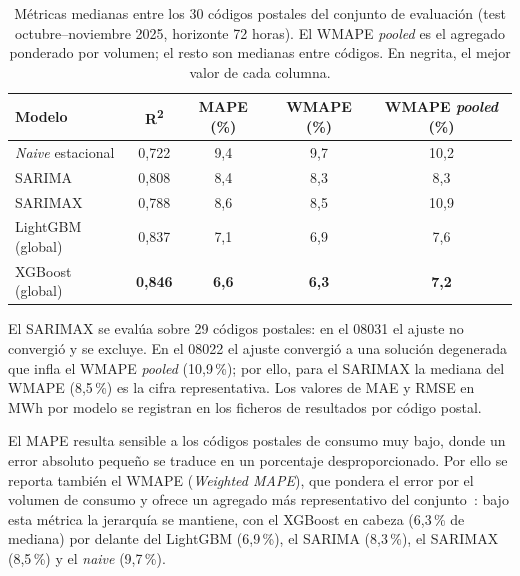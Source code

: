 \documentclass[12pt, a4paper]{article}
\begin{document}
\begin{table}[htbp]
\centering
\caption{Métricas medianas entre los 30 códigos postales del conjunto de evaluación (test octubre--noviembre 2025, horizonte 72 horas). El WMAPE \textit{pooled} es el agregado ponderado por volumen; el resto son medianas entre códigos. En negrita, el mejor valor de cada columna.}
\label{tab:comparativa}
\begin{tabular}{lcccc}
\toprule
Modelo & R\textsuperscript{2} & MAPE (\%) & WMAPE (\%) & WMAPE \textit{pooled} (\%) \\
\midrule
\textit{Naive} estacional & 0,722 & 9,4 & 9,7 & 10,2 \\
SARIMA & 0,808 & 8,4 & 8,3 & 8,3 \\
SARIMAX & 0,788 & 8,6 & 8,5 & 10,9 \\
LightGBM (global) & 0,837 & 7,1 & 6,9 & 7,6 \\
XGBoost (global) & \textbf{0,846} & \textbf{6,6} & \textbf{6,3} & \textbf{7,2} \\
\bottomrule
\end{tabular}

\vspace{4pt}
{\footnotesize\raggedright El SARIMAX se evalúa sobre 29 códigos postales: en el 08031 el ajuste no convergió y se excluye. En el 08022 el ajuste convergió a una solución degenerada que infla el WMAPE \textit{pooled} (10,9\,\%); por ello, para el SARIMAX la mediana del WMAPE (8,5\,\%) es la cifra representativa. Los valores de MAE y RMSE en MWh por modelo se registran en los ficheros de resultados por código postal.\par}
\end{table}

El MAPE resulta sensible a los códigos postales de consumo muy bajo, donde un error absoluto pequeño se traduce en un porcentaje desproporcionado. Por ello se reporta también el WMAPE (\textit{Weighted MAPE}), que pondera el error por el volumen de consumo y ofrece un agregado más representativo del conjunto~\cite{hyndman2021}: bajo esta métrica la jerarquía se mantiene, con el XGBoost en cabeza (6,3\,\% de mediana) por delante del LightGBM (6,9\,\%), el SARIMA (8,3\,\%), el SARIMAX (8,5\,\%) y el \textit{naive} (9,7\,\%).
\end{document}
